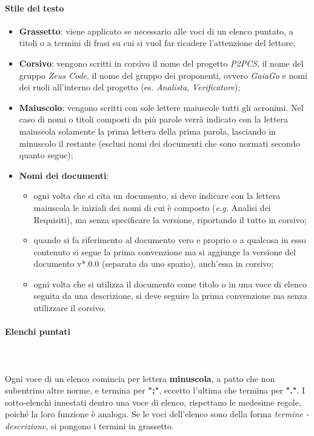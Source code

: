 		\paragraph{Stile del testo}
		\begin{itemize}
			\item \textbf{Grassetto}:
			viene applicato se necessario alle voci di un elenco puntato, a titoli o a termini di frasi su cui si vuol far ricadere l'attenzione del lettore;
			\item \textbf{Corsivo}: vengono scritti in corsivo il nome del progetto \textit{P2PCS}, il nome del gruppo \textit{Zeus Code}, il nome del gruppo dei proponenti, ovvero \textit{GaiaGo} e nomi dei ruoli all'interno del progetto (es. \textit{Analista}, \textit{Verificatore}); %
			\item \textbf{Maiuscolo}: vengono scritti con sole lettere maiuscole tutti gli acronimi. Nel caso di nomi o titoli composti da più parole verrà indicato con la lettera maiuscola solamente la prima lettera della prima parola, lasciando in minuscolo il restante (esclusi nomi dei documenti che sono normati secondo quanto segue);
			\item \textbf{Nomi dei documenti}:
			\begin{itemize}
				\item ogni volta che si cita un documento, si deve indicare con la lettera maiuscola le iniziali dei nomi di cui è composto (\textit{e.g.} Analisi dei Requisiti), ma senza specificare la versione, riportando il tutto in corsivo;
				\item quando si fa riferimento al documento vero e proprio o a qualcosa in esso contenuto si segue la prima convenzione ma si aggiunge la versione del documento v*.0.0 (separata da uno spazio), anch'essa in corsivo;
				\item ogni volta che si utilizza il documento come titolo o in una voce di elenco seguita da una descrizione, si deve seguire la prima convenzione ma senza utilizzare il corsivo.
			\end{itemize}
		\end{itemize}
		\paragraph{Elenchi puntati} \mbox{}\\ \mbox{}\\
		Ogni voce di un elenco comincia per lettera \textbf{minuscola}, a patto che non subentrino altre norme, e termina per \textbf{";"}, eccetto l'ultima che termina per \textbf{"."}. I sotto-elenchi innestati dentro una voce di elenco, rispettano le medesime regole, poiché la loro funzione è analoga.\newline
		Se le voci dell'elenco sono della forma \textit{termine - descrizione}, si pongono i termini in grassetto.
